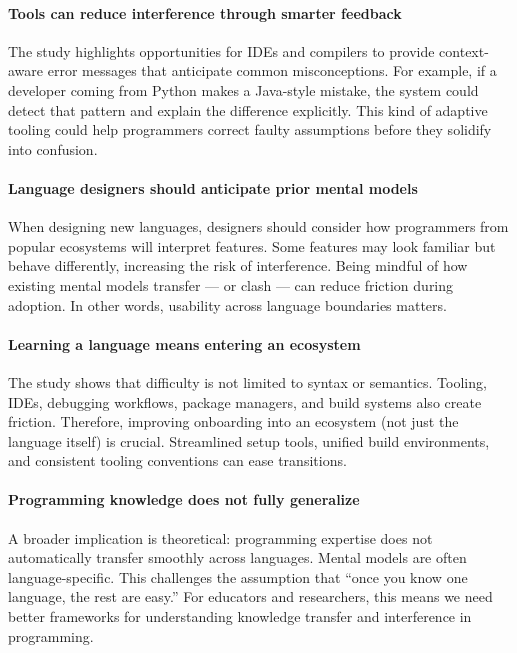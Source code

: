 \paragraph{Tools can reduce interference through smarter feedback}
The study highlights opportunities for IDEs and compilers to provide context-aware error messages that anticipate common misconceptions. For example, if a developer coming from Python makes a Java-style mistake, the system could detect that pattern and explain the difference explicitly. This kind of adaptive tooling could help programmers correct faulty assumptions before they solidify into confusion.

\paragraph{Language designers should anticipate prior mental models}
When designing new languages, designers should consider how programmers from popular ecosystems will interpret features. Some features may look familiar but behave differently, increasing the risk of interference. Being mindful of how existing mental models transfer — or clash — can reduce friction during adoption. In other words, usability across language boundaries matters.

\paragraph{Learning a language means entering an ecosystem}
The study shows that difficulty is not limited to syntax or semantics. Tooling, IDEs, debugging workflows, package managers, and build systems also create friction. Therefore, improving onboarding into an ecosystem (not just the language itself) is crucial. Streamlined setup tools, unified build environments, and consistent tooling conventions can ease transitions.

\paragraph{Programming knowledge does not fully generalize}
A broader implication is theoretical: programming expertise does not automatically transfer smoothly across languages. Mental models are often language-specific. This challenges the assumption that “once you know one language, the rest are easy.” For educators and researchers, this means we need better frameworks for understanding knowledge transfer and interference in programming.